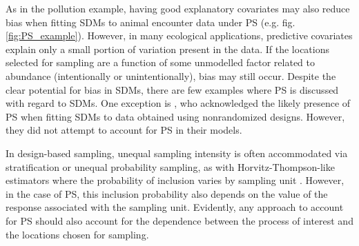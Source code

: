 \documentclass[times,mee,doublespace,]{besauth2}
\begin{document}
As in the pollution example, having good explanatory covariates may also reduce bias when fitting SDMs to animal encounter data under PS (e.g. fig. \ref{fig:PS_example}).  However, in many ecological applications, predictive covariates explain only a small portion of variation present in the data.  If the locations selected for sampling are a function of some unmodelled factor related to abundance (intentionally or unintentionally), bias may still occur.  Despite the clear potential for bias in SDMs, there are few examples where PS \citep[\textit{sensu}][]{DiggleEtAl2010} is discussed with regard to SDMs.  One exception is
\citet{ChakrabortyEtAl2010}, who acknowledged the likely presence of PS when fitting SDMs to data obtained using nonrandomized designs.  However, they did not attempt to account for PS in their models.

In design-based sampling, unequal sampling intensity is often accommodated via stratification or unequal probability sampling, as with Horvitz-Thompson-like estimators where the probability of inclusion varies by sampling unit \citep{Cochran1977}.  However, in the case of PS, this inclusion probability also depends on the value of the response associated with the sampling unit.  Evidently, any approach to account for PS should also account for the dependence between the process of interest and the locations chosen for sampling.
\end{document}

